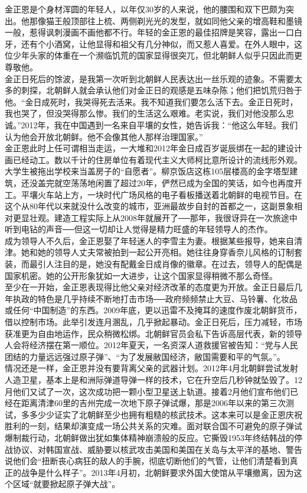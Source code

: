 金正恩是个身材浑圆的年轻人，以年仅30岁的人来说，他的腰围和双下巴颇为突出。他那像猫王般顶部往上梳、两侧剃光光的发型，就如同他父亲的增高鞋和墨镜一般，惹得讽刺漫画不画他都不行。年轻的金正恩的最佳招牌是笑容，露出一口白牙，还有个小酒窝，让他显得和祖父有几分神似，而又惹人喜爱。在外人眼中，这位少年头家的体重在一个濒临饥荒的国家显得很突兀，但北朝鲜人似乎只因此而更尊敬他。\\

金正日死后的馀波，是我第一次听到北朝鲜人民表达出一丝乐观的迹象。不需要太多的刺探，北朝鲜人就会承认他们对金正日的观感是五味杂陈；他们把饥荒归咎于他。“金日成死时，我哭得死去活来。我不知道我们要怎么活下去。金正日死时，我也哭了，但没哭得那么惨。我们的生活这么艰难。老实说，我们对他没那么忠诚。”2012年，我在中国遇到一名来自平壤的女性，她告诉我：“他这么年轻。我们认为他会开放北朝鲜。他不会像其他人那样治理国家。”\\

金正恩此时上任可谓相当走运，一大堆和2012年金日成百岁诞辰绑在一起的建设计画已经动工。数以千计的住房单位有着现代主义大师柯比意所设计的流线形外观。大学生被拖出学校来当盖房子的“自愿者”。柳京饭店这栋105层楼高的金字塔型建筑，还没盖完就空荡荡地闲置了超过20年，俨然已成为全国的笑话，如今也再度开工。平壤火车站上方，一块时代广场风格的电子看板播送着北朝鲜的电视节目。在这个从80年代以来就没什么改变的城市，亚洲最故步自封的首都之一，这副景象相对更显壮观。建造工程实际上从2008年就展开了──那年，我很讶异在一次旅途中听到电钻的声音──但这一切却让人觉得是精力旺盛的年轻领导人的杰作。\\

成为领导人不久后，金正恩娶了年轻迷人的李雪主为妻。根据某些报导，她来自清津。她和她的领导人丈夫常被拍到一起公开亮相。她往往身穿香奈儿风格的订制套装，而最引人注目的是，她没有配戴金日成肖像的徽章。在过去，领导人的配偶是国家机密。她的公开形象犹如一大进步，让这个国家显得稍微不那么奇怪。\\

至少在一开始，金正恩表现得比他父亲对经济改革的态度更为开放。金正日最后几年执政的特色是几乎持续不断地打击市场──政府频频禁止大豆、马铃薯、化妆品或任何“中国制造”的东西。2009年底，更以迅雷不及掩耳的速度作废北朝鲜货币，借以控制市场。此举引发连月溷乱，几乎掀起暴动。金正日死后，压力减轻，市场获准更为自由地运作，民众稍微松绑。北朝鲜官员会私下告诉高层代表，新的领导人会将经济摆在第一顺位。2012年夏天，一名资深人道救援官被告知：“党与人民团结的力量远远强过原子弹”、“为了发展敝国经济，敝国需要和平的气氛。”。\\

情况还是一样，金正恩并没有要背离父亲的武器计划。2012年4月北朝鲜尝试发射人造卫星，基本上是和洲际弹道导弹一样的技术，它在升空后几秒钟就坠毁了。12月他们又试了一次，这次成功把一颗小型卫星送上轨道。接着2月他们宣布他们已经在距离清津60里的吉州完成一次地下原子弹试爆，那是2006年以来的第三次测试，多多少少证实了北朝鲜至少也拥有粗糙的核武技术。这本来可以是金正恩庆祝胜利的一刻，结果却演变成一场公共关系的灾难。面对联合国不可避免的原子弹试爆制裁行动，北朝鲜做出犹如集体精神崩溃般的反应。它撕毁1953年终结韩战的停战协议、对韩国宣战、威胁要以核武攻击美国和美国在关岛与太平洋的基地、警告说他们会“扭断丧心病狂的敌人的手腕，彻底切断他们的气管，让他们清楚看到真正的战争是什么样子”。2013年4月初，北朝鲜要求外国大使馆从平壤撤离，因为这个区域“就要掀起原子弹大战”。\\

